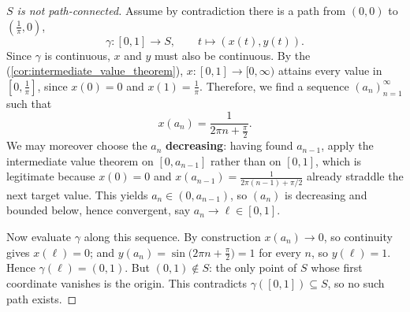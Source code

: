 \begin{proof}[$S$ is not path-connected]
Assume by contradiction there is a path from $(0,0)$ to $(\tfrac{1}{\pi}, 0)$,
\[
\gamma : [0,1] \to S, \qquad t \mapsto (x(t), y(t)).
\]
Since $\gamma$ is continuous, $x$ and $y$ must also be continuous. By the  (\cref{cor:intermediate_value_theorem}), $x : [0,1] \to [0,\infty)$
attains every value in $[0,\tfrac{1}{\pi}]$, since $x(0) = 0$ and $x(1) = \tfrac{1}{\pi}$.
Therefore, we find a sequence $(a_n)_{n=1}^{\infty}$ such that
\[
x(a_n) = \frac{1}{2\pi n + \tfrac{\pi}{2}}.
\]
We may moreover choose the $a_n$ \textbf{decreasing}: having found $a_{n-1}$, apply the
intermediate value theorem on $[0,a_{n-1}]$ rather than on $[0,1]$, which is legitimate because
$x(0) = 0$ and $x(a_{n-1}) = \tfrac{1}{2\pi(n-1)+\pi/2}$ already straddle the next target value.
This yields $a_n \in (0,a_{n-1})$, so $(a_n)$ is decreasing and bounded below, hence convergent,
say $a_n \to \ell \in [0,1]$.

Now evaluate $\gamma$ along this sequence. By construction $x(a_n) \to 0$, so continuity gives
$x(\ell) = 0$; and $y(a_n) = \sin\!\big(2\pi n + \tfrac\pi2\big) = 1$ for every $n$, so
$y(\ell) = 1$. Hence $\gamma(\ell) = (0,1)$. But $(0,1) \notin S$: the only point of $S$ whose
first coordinate vanishes is the origin. This contradicts $\gamma([0,1]) \subseteq S$, so no
such path exists.
\end{proof}


